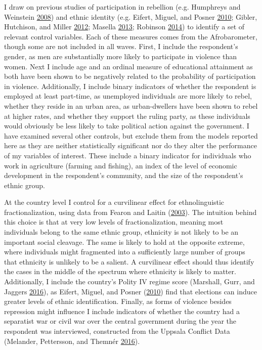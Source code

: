 \documentclass[12pt,]{book}
\theoremstyle{definition}
\theoremstyle{definition}
\theoremstyle{definition}
\theoremstyle{remark}
\begin{document}
I draw on previous studies of participation in rebellion (e.g. Humphreys
and Weinstein \protect\hyperlink{ref-Humphreys2008}{2008}) and ethnic
identity (e.g. Eifert, Miguel, and Posner
\protect\hyperlink{ref-Eifert2010}{2010}; Gibler, Hutchison, and Miller
\protect\hyperlink{ref-Gibler2012}{2012}; Masella
\protect\hyperlink{ref-Masella2013}{2013}; Robinson
\protect\hyperlink{ref-Robinson2014}{2014}) to identify a set of
relevant control variables. Each of these measures comes from the
Afrobarometer, though some are not included in all waves. First, I
include the respondent's gender, as men are substantially more likely to
participate in violence than women. Next I include age and an ordinal
measure of educational attainment as both have been shown to be
negatively related to the probability of participation in violence.
Additionally, I include binary indicators of whether the respondent is
employed at least part-time, as unemployed individuals are more likely
to rebel, whether they reside in an urban area, as urban-dwellers have
been shown to rebel at higher rates, and whether they support the ruling
party, as these individuals would obviously be less likely to take
political action against the government. I have examined several other
controls, but exclude them from the models reported here as they are
neither statistically significant nor do they alter the performance of
my variables of interest. These include a binary indicator for
individuals who work in agriculture (farming and fishing), an index of
the level of economic development in the respondent's community, and the
size of the respondent's ethnic group.

At the country level I control for a curvilinear effect for
ethnolinguistic fractionalization, using data from Fearon and Laitin
(\protect\hyperlink{ref-fearonlaitin03}{2003}). The intuition behind
this choice is that at very low levels of fractionalization, meaning
most individuals belong to the same ethnic group, ethnicity is not
likely to be an important social cleavage. The same is likely to hold at
the opposite extreme, where individuals might fragmented into a
sufficiently large number of groups that ethnicity is unlikely to be a
salient. A curvilinear effect should thus identify the cases in the
middle of the spectrum where ethnicity is likely to matter.
Additionally, I include the country's Polity IV regime score (Marshall,
Gurr, and Jaggers \protect\hyperlink{ref-Marshall2016}{2016}), as
Eifert, Miguel, and Posner (\protect\hyperlink{ref-Eifert2010}{2010})
find that elections can induce greater levels of ethnic identification.
Finally, as forms of violence besides repression might influence I
include indicators of whether the country had a separatist war or civil
war over the central government during the year the respondent was
interviewed, constructed from the Uppsala Conflict Data (Melander,
Pettersson, and Themnér \protect\hyperlink{ref-Melander2016}{2016}).
\end{document}
